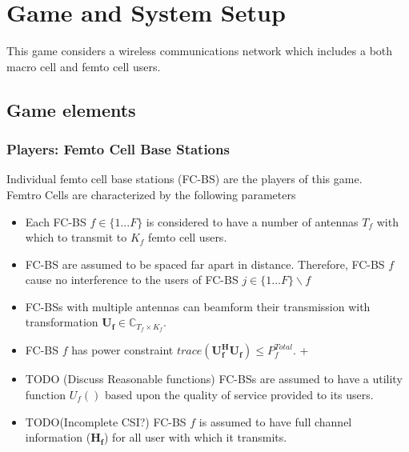 \documentclass[12pt]{article}
\begin{document}
\section{Game and System Setup}

This game considers a wireless communications network which includes a both macro cell and femto cell users.

\subsection{Game elements}
\subsubsection{Players: Femto Cell Base Stations}


Individual femto cell base stations (FC-BS) are the players of this game.
\\
Femtro Cells are characterized by the following parameters
\begin{itemize}
\item Each FC-BS  $f \in \{1 ... F\}$ is considered to have a number of antennas $T_f$ with which to transmit to $K_f$ femto cell users.
\\
\item FC-BS are assumed to be spaced far apart in distance. Therefore, FC-BS $f$ cause no interference to the users of FC-BS $j \in \{1 ... F\}\backslash f$
\\
\item FC-BSs with multiple antennas can beamform their transmission with transformation $\mathbf{U_f} \in \mathbb{C}_{T_f \times K_f}$.
\\
\item 
FC-BS $f$ has power constraint  $trace(\mathbf{U_f^H}\mathbf{U_f}) \leq P^{Total}_{f} $. +

\item 
TODO (Discuss Reasonable functions) FC-BSs are assumed to have a utility function $U_f()$ based upon the quality of service provided to its users.
\\
\item TODO(Incomplete CSI?) FC-BS $f$ is assumed to have full channel information ($\mathbf{H_f}$) for all user  with which it transmits.
\\
\end{itemize}
\end{document}
